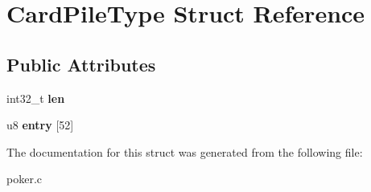 \hypertarget{structCardPileType}{}\section{Card\+Pile\+Type Struct Reference}
\label{structCardPileType}
\subsection*{Public Attributes}
\begin{DoxyCompactItemize}
\item 
\mbox{\label{structCardPileType_a1eb13d658b445dd4fd8a27dd039d098a}} 
int32\+\_\+t {\bfseries len}
\item 
\mbox{\label{structCardPileType_a10602423899018c878601a1a8d833257}} 
u8 {\bfseries entry} \mbox{[}52\mbox{]}
\end{DoxyCompactItemize}


The documentation for this struct was generated from the following file\+:\begin{DoxyCompactItemize}
\item 
poker.\+c\end{DoxyCompactItemize}
